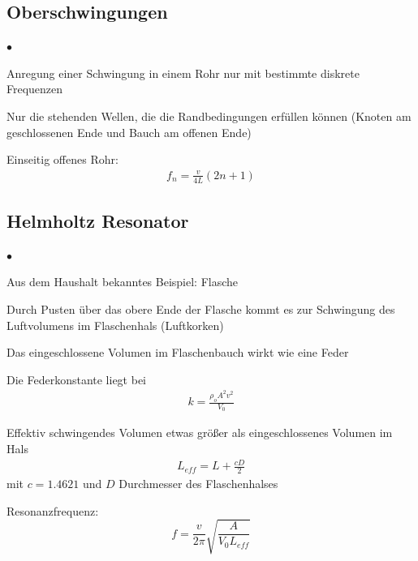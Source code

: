 \documentclass{report}
\begin{document}
\subsection{Oberschwingungen}
\begin{list}{$\bullet$}{}
    \item Anregung einer Schwingung in einem Rohr nur mit bestimmte diskrete Frequenzen
    \item Nur die stehenden Wellen, die die Randbedingungen erfüllen können (Knoten am geschlossenen Ende und Bauch am offenen Ende)
    \item Einseitig offenes Rohr: 
    \begin{equation}
        \begin{split}
            f_n = \frac{v}{4L} (2n+1)
        \end{split}
    \end{equation}
\end{list}
\subsection{Helmholtz Resonator}
\begin{list}{$\bullet$}{}
    \item Aus dem Haushalt bekanntes Beispiel: Flasche
    \item Durch Pusten über das obere Ende der Flasche kommt es zur Schwingung des Luftvolumens im Flaschenhals (Luftkorken)
    \item Das eingeschlossene Volumen im Flaschenbauch wirkt wie eine Feder
    \item Die Federkonstante liegt bei 
        \begin{equation}
            \begin{split}
                k = \frac{\rho_o A^2 v^2}{V_0}
            \end{split}
        \end{equation}
    \item Effektiv schwingendes Volumen etwas größer als eingeschlossenes Volumen im Hals 
        \begin{equation}
            \begin{split}
                L_{eff} = L + \frac{cD}{2}
            \end{split}
        \end{equation}
        mit $c = 1.4621$ und $D$ Durchmesser des Flaschenhalses
    \item Resonanzfrequenz:
        \begin{equation}
            f = \frac{v}{2\pi}\sqrt{\frac{A}{V_0 L_{eff}}}
            \label{eq:HelmholtzResFreq}
        \end{equation}
\end{list}
\end{document}
